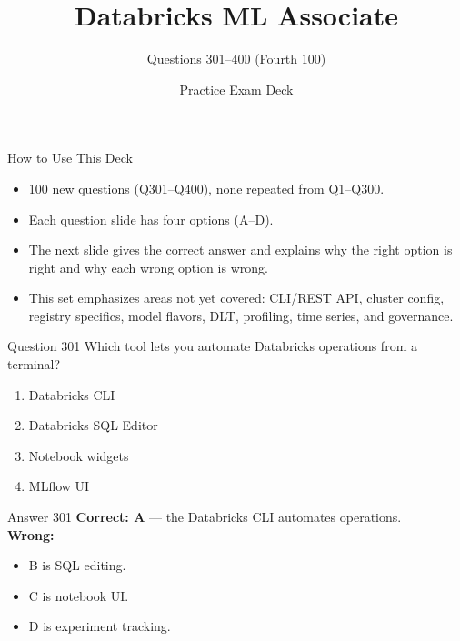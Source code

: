 \documentclass[aspectratio=169,11pt]{beamer}
\title{Databricks ML Associate}
\subtitle{Questions 301--400 (Fourth 100)}
\author{Practice Exam Deck}
\date{}
\begin{document}
	
	\begin{frame}
		\titlepage
	\end{frame}
	
	\begin{frame}{How to Use This Deck}
		\begin{itemize}
			\item 100 new questions (Q301--Q400), none repeated from Q1--Q300.
			\item Each question slide has four options (A--D).
			\item The next slide gives the correct answer and explains why the right option is right and why each wrong option is wrong.
			\item This set emphasizes areas not yet covered: CLI/REST API, cluster config, registry specifics, model flavors, DLT, profiling, time series, and governance.
		\end{itemize}
	\end{frame}
	
	\begin{frame}{Question 301}
		Which tool lets you automate Databricks operations from a terminal?
		\begin{enumerate}[label=\Alph*.]
			\item Databricks CLI
			\item Databricks SQL Editor
			\item Notebook widgets
			\item MLflow UI
		\end{enumerate}
	\end{frame}
	\begin{frame}{Answer 301}
		\textbf{Correct: A} --- the Databricks CLI automates operations.\\
		\vspace{0.5em}
		\textbf{Wrong:}
		\begin{itemize}
			\item B is SQL editing.
			\item C is notebook UI.
			\item D is experiment tracking.
		\end{itemize}
	\end{frame}
	
\end{document}
